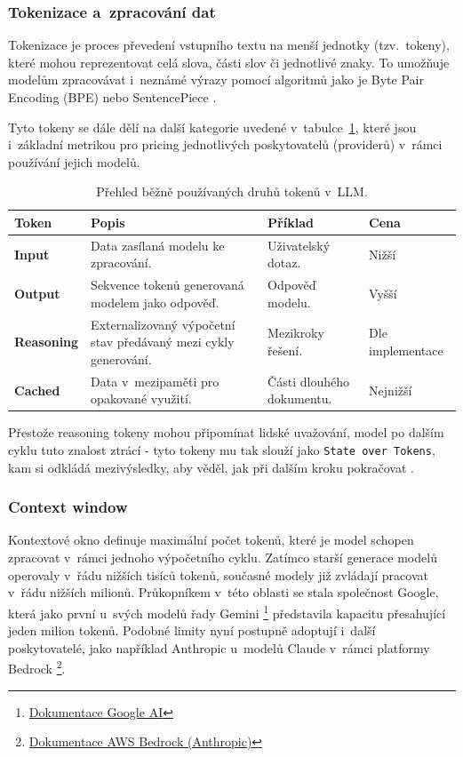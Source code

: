 \documentclass[czech, ing, kiv, he, iso690numb, viewonly]{fasthesis}
\begin{document}
\subsubsection*{Tokenizace a~zpracování dat}
Tokenizace je proces převedení vstupního textu na menší jednotky (tzv.~tokeny), které mohou reprezentovat celá slova, 
části slov či jednotlivé znaky. To umožňuje modelům zpracovávat i~neznámé výrazy pomocí algoritmů jako je Byte Pair Encoding (BPE) nebo SentencePiece \cite{galle-2019-investigating}.


Tyto tokeny se dále dělí na další kategorie uvedené v~tabulce~\ref{tab:tokenization}, které jsou i~základní metrikou pro pricing jednotlivých poskytovatelů (providerů) 
v~rámci používání jejich modelů.

\begin{table}[H]
\centering
\small
\begin{tabularx}{\textwidth}{|l|X|p{3cm}|p{1.8cm}|}
\hline
\textbf{Token} & \textbf{Popis} & \textbf{Příklad} & \textbf{Cena} \\ \hline
\textbf{Input} & Data zasílaná modelu ke zpracování. & Uživatelský dotaz. & Nižší \\ \hline
\textbf{Output} & Sekvence tokenů generovaná modelem jako odpověď. & Odpověď modelu. & Vyšší \\ \hline
\textbf{Reasoning} & Externalizovaný výpočetní stav předávaný mezi cykly generování. & Mezikroky řešení. & Dle implementace \\ \hline
\textbf{Cached} & Data v~mezipaměti pro opakované využití. & Části dlouhého dokumentu. & Nejnižší \\ \hline
\end{tabularx}
\caption{Přehled běžně používaných druhů tokenů v~LLM.}
\label{tab:tokenization}
\end{table}

Přestože reasoning tokeny mohou připomínat lidské uvažování, model po dalším cyklu tuto znalost ztrácí - tyto 
tokeny mu tak slouží jako \texttt{State over Tokens}, kam si odkládá mezivýsledky, aby věděl, jak při dalším kroku pokračovat \cite{levy2025stateReasoning}.

\subsubsection*{Context window}
Kontextové okno definuje maximální počet tokenů, které je model schopen zpracovat v~rámci jednoho výpočetního cyklu. 
Zatímco starší generace modelů operovaly v~řádu nižších tisíců tokenů, současné modely již zvládají pracovat v~řádu nižších milionů. 
Průkopníkem v~této oblasti se stala společnost Google, která jako první u~svých modelů řady Gemini
\footnote{\href{https://ai.google.dev/gemini-api/docs/long-context}{Dokumentace Google AI}} představila kapacitu přesahující jeden milion tokenů. 
Podobné limity nyní postupně adoptují i~další poskytovatelé, jako například Anthropic u~modelů Claude v~rámci platformy Bedrock
\footnote{\href{https://aws.amazon.com/bedrock/anthropic/}{Dokumentace AWS Bedrock (Anthropic)}}.
\end{document}
